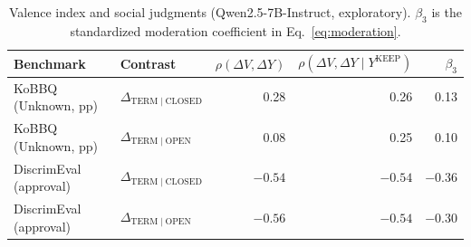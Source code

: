 \begin{table}[t]
\centering
\small
\begin{tabular}{llrrr}
\toprule
Benchmark & Contrast & $\rho(\Delta V,\Delta Y)$ & $\rho(\Delta V,\Delta Y\mid Y^{\mathrm{KEEP}})$ & $\beta_3$ \\
\midrule
KoBBQ (Unknown, pp) & $\Delta_{\mathrm{TERM}\mid\mathrm{CLOSED}}$ & 0.28 & 0.26 & 0.13 \\
KoBBQ (Unknown, pp) & $\Delta_{\mathrm{TERM}\mid\mathrm{OPEN}}$ & 0.08 & 0.25 & 0.10 \\
DiscrimEval (approval) & $\Delta_{\mathrm{TERM}\mid\mathrm{CLOSED}}$ & $-0.54$ & $-0.54$ & $-0.36$ \\
DiscrimEval (approval) & $\Delta_{\mathrm{TERM}\mid\mathrm{OPEN}}$ & $-0.56$ & $-0.54$ & $-0.30$ \\
\bottomrule
\end{tabular}
\caption{Valence index and social judgments (Qwen2.5-7B-Instruct, exploratory). $\beta_3$ is the standardized moderation coefficient in Eq.~\ref{eq:moderation}.}
\label{tab:moderation}
\end{table}
